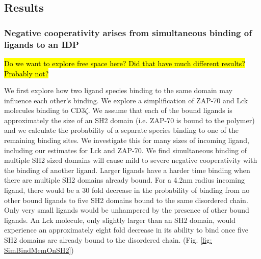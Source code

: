 \documentclass[../../AdvancementSummary.tex]{subfiles}
\begin{document}

\subsection{Results}

\subsubsection{Negative cooperativity arises from simultaneous binding of ligands to an IDP}

\hl{Do we want to explore free space here? Did that have much different results? Probably not?}

We first explore how two ligand species binding to the same domain may influence each other's binding. We explore a simplification of ZAP-70 and Lck molecules binding to CD3$\zeta$. We assume that each of the bound ligands is approximately the size of an SH2 domain (i.e. ZAP-70 is bound to the polymer) and we calculate the probability of a separate species binding to one of the remaining binding sites.  We investigate this for many sizes of incoming ligand, including our estimates for Lck and ZAP-70. We find simultaneous binding of multiple SH2 sized domains will cause mild to severe negative cooperativity with the binding of another ligand. Larger ligands have a harder time binding when there are multiple SH2 domains already bound. For a 4.2nm radius incoming ligand, there would be a 30 fold decrease in the probability of binding from no other bound ligands to five SH2 domains bound to the same disordered chain. Only very small ligands would be unhampered by the presence of other bound ligands. An Lck molecule, only slightly larger than an SH2 domain, would experience an approximately eight fold decrease in its ability to bind once five SH2 domains are already bound to the disordered chain. (Fig. \ref{fig: SimBindMemOnSH2})
\end{document}
